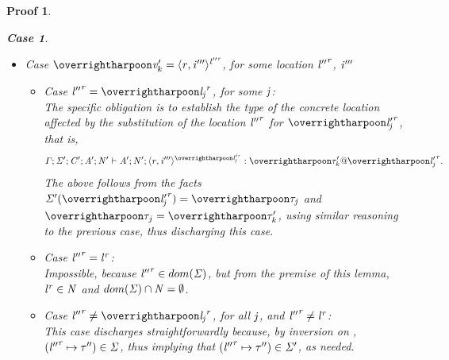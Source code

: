 \documentclass[showabstract,showacknowledgments,showpreface,showdedication]{iuphd}
\newtheorem*{bcase}{Case}
\theoremstyle{nonumberplain}
\newtheorem{nproof}{Proof}
\begin{document}
\begin{nproof}
\begin{bcase}
\begin{itemize}
\begin{itemize}
        This case discharges immediately by implication of the typing judgement of the
        source term given in the premise of this lemma, and by inversion on \tvar{}.
      \end{itemize}
    \item Case $\overharpoon{\VAL'_k} = \concreteloc{\reg}{\ind'''}{\locreg{\loc''}{\reg}}$,
      for some location ${\mathit{l}''}^{\mathit{r}}$, $\mathit{i}'''$\\
      \begin{itemize}
      \item Case $\locreg{\loc''}{\reg} = \overharpoon{\locreg{\loc_{\indj}}{\reg}}$, for some
        $\mathit{j}$:\\
        The specific obligation is to establish the type of
        the concrete location affected by the substitution of the location ${\mathit{l}''}^{\mathit{r}}$
        for $\overharpoon{\locreg{\loc'_{\indj}}{\reg}}$, that is,
        \begin{displaymath}
        \TENV; \SENV'; \CENV'; \AENV'; \NENV' \vdash \AENV'; \NENV'; \concreteloc{\reg}{\ind'''}{\overharpoon{\locreg{\loc'_{\indj}}{\reg}}} : \overharpoon{\TYP'_k} \ensuremath{@} \overharpoon{\locreg{\loc'_j}{\reg}}.
        \end{displaymath}
        The above follows from the facts $\SENV'(\overharpoon{\locreg{\loc'_{\indj}}{\reg}}) = \overharpoon{\TYP_{\indj}}$
        and $\overharpoon{\TYP_j} = \overharpoon{\TYP'_k}$, using
        similar reasoning to the previous case, thus discharging this case.
      \item Case ${\mathit{l}''}^{\mathit{r}} = {\mathit{l}}^{\mathit{r}}$:\\
      Impossible, because ${\mathit{l}''}^{\mathit{r}} \in dom(\mathit{\Sigma})$, but from the premise of this lemma,
      ${\mathit{l}}^{\mathit{r}} \in \mathit{N}$ and $dom(\mathit{\Sigma}) \cap \mathit{N} = \emptyset$.
      \item Case $\locreg{\loc''}{\reg} \neq \overharpoon{\locreg{\loc_{\indj}}{\reg}}$, for all
        $\mathit{j}$, and ${\mathit{l}''}^{\mathit{r}} \neq {\mathit{l}}^{\mathit{r}}$:\\
        This case discharges straightforwardly because, by inversion on \tconcreteloc{},
        $({\mathit{l}''}^{\mathit{r}} \mapsto \mathit{\tau}'') \in \mathit{\Sigma}$, thus implying that
        $({\mathit{l}''}^{\mathit{r}} \mapsto \mathit{\tau}'') \in \mathit{\Sigma}'$,
        as needed.
      \end{itemize}
    \end{itemize}
  \end{bcase}


\end{nproof}
\end{document}
